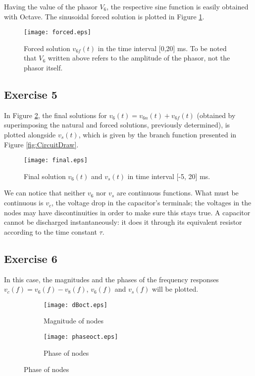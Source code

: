 Having the value of the phasor $V_6$, the respective sine function is easily obtained with Octave. The sinusoidal forced solution is plotted in Figure \ref{fig:ForcedSolutionGraph}.

\begin{figure}[H]
  \centering
  \texttt{[image: forced.eps]}
  \caption{Forced solution $v_{6f}(t)$ in the time interval [0,20] ms. To be noted that $V_6$ written above refers to the amplitude of the phasor, not the phasor itself.}
  \label{fig:ForcedSolutionGraph}
\end{figure}

\subsection{Exercise 5} \label{sec:Ex5Theo}

In Figure \ref{fig:final}, the final solutions for $v_6 (t)=v_{6n}(t)+v_{6f}(t)$ (obtained by superimposing the natural and forced solutions, previously determined), is plotted alongside $v_s(t)$, which is given by the branch function presented in Figure \ref{fig:CircuitDraw}.


\begin{figure}[H] \centering
  \texttt{[image: final.eps]}
  \caption{Final solution $v_6(t)$ and $v_s(t)$ in time interval [-5, 20] ms.}
  \label{fig:final}
\end{figure}

We can notice that neither $v_6$ nor $v_s$ are continuous functions. What must be continuous is $v_c$, the voltage drop in the capacitor's terminals; the voltages in the nodes may have discontinuities in order to make sure this stays true. A capacitor cannot be discharged instantaneously: it does it through its equivalent resistor according to the time constant $\tau$.


\subsection{Exercise 6} \label{sec:Ex6Theo}

In this case, the magnitudes and the phases of the frequency responses $v_c(f)=v_6(f)-v_8(f)$, $v_6(f)$ and $v_s(f)$ will be plotted.

 \begin{figure}[H]
 \footnotesize
\begin{subfigure}{.49\linewidth}
 \footnotesize
  \centering
  \texttt{[image: dBoct.eps]}
   \footnotesize
\caption{Magnitude of nodes}
\label{fig:final_magnitude}
\end{subfigure}
\begin{subfigure}{.49\linewidth}
  \centering
  \texttt{[image: phaseoct.eps]}  
\caption{Phase of nodes}
\label{fig:final_phase}
\end{subfigure}
\end{figure}



